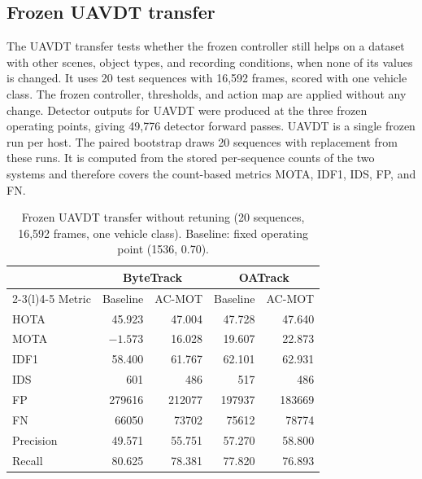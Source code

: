 \documentclass[pdflatex,sn-mathphys-num,iicol]{sn-jnl}
\begin{document}
\subsection{Frozen UAVDT transfer}
The UAVDT transfer tests whether the frozen controller still helps on a
dataset with other scenes, object types, and recording conditions, when none
of its values is changed. It uses 20 test sequences with 16,592 frames, scored
with one vehicle class. The frozen controller, thresholds, and action map are
applied without any change. Detector outputs for UAVDT were produced at the three
frozen operating points, giving 49,776 detector forward passes. UAVDT is a
single frozen run per host. The paired bootstrap draws 20 sequences with
replacement from these runs. It is computed from the stored per-sequence
counts of the two systems and therefore covers the count-based metrics MOTA,
IDF1, IDS, FP, and FN.

\begin{table}[t]
\caption{Frozen UAVDT transfer without retuning (20 sequences, 16,592 frames,
one vehicle class). Baseline: fixed operating point (1536, 0.70).}
\label{tab:uavdt}
\centering\footnotesize
\setlength{\tabcolsep}{4pt}
\begin{tabular}{@{}lrrrr@{}}
\toprule
 & \multicolumn{2}{c}{ByteTrack} & \multicolumn{2}{c}{OATrack}\\
\cmidrule(lr){2-3}\cmidrule(l){4-5}
Metric & Baseline & AC-MOT & Baseline & AC-MOT\\
\midrule
HOTA & 45.923 & 47.004 & 47.728 & 47.640\\
MOTA & $-1.573$ & 16.028 & 19.607 & 22.873\\
IDF1 & 58.400 & 61.767 & 62.101 & 62.931\\
IDS & 601 & 486 & 517 & 486\\
FP & 279616 & 212077 & 197937 & 183669\\
FN & 66050 & 73702 & 75612 & 78774\\
Precision & 49.571 & 55.751 & 57.270 & 58.800\\
Recall & 80.625 & 78.381 & 77.820 & 76.893\\
\bottomrule
\end{tabular}
\end{table}
\end{document}

